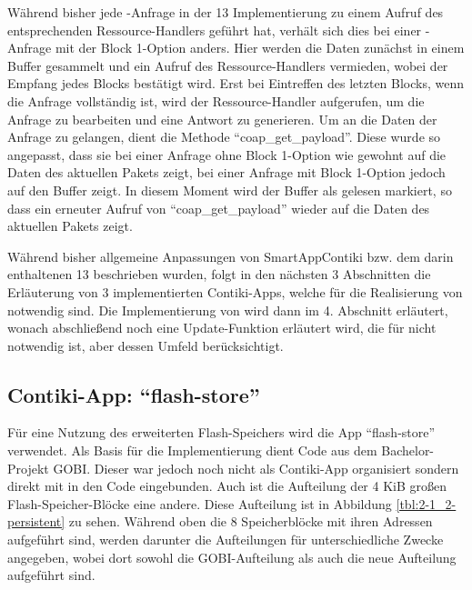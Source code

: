 Während bisher jede -Anfrage in der  13 Implementierung zu einem Aufruf des entsprechenden Ressource-Handlers geführt hat, verhält sich
dies bei einer -Anfrage mit der Block 1-Option anders. Hier werden die Daten zunächst in einem Buffer gesammelt und ein Aufruf des Ressource-Handlers
vermieden, wobei der Empfang jedes Blocks bestätigt wird. Erst bei Eintreffen des letzten Blocks, wenn die Anfrage vollständig ist, wird der Ressource-Handler
aufgerufen, um die Anfrage zu bearbeiten und eine Antwort zu generieren. Um an die Daten der Anfrage zu gelangen, dient die Methode "`coap\_get\_payload"'.
Diese wurde so angepasst, dass sie bei einer Anfrage ohne Block 1-Option wie gewohnt auf die Daten des aktuellen Pakets zeigt, bei einer Anfrage mit Block 1-Option
jedoch auf den Buffer zeigt. In diesem Moment wird der Buffer als gelesen markiert, so dass ein erneuter Aufruf von "`coap\_get\_payload"' wieder auf die Daten
des aktuellen Pakets zeigt.

Während bisher allgemeine Anpassungen von SmartAppContiki bzw. dem darin enthaltenen  13 beschrieben wurden, folgt in den nächsten 3 Abschnitten
die Erläuterung von 3 implementierten Contiki-Apps, welche für die Realisierung von  notwendig sind. Die Implementierung von  wird dann
im 4. Abschnitt erläutert, wonach abschließend noch eine Update-Funktion erläutert wird, die für  nicht notwendig ist, aber dessen Umfeld berücksichtigt.

\subsection{Contiki-App: "`flash-store"'}

Für eine Nutzung des erweiterten Flash-Speichers wird die App "`flash-store"' verwendet. Als Basis für die Implementierung dient Code aus dem Bachelor-Projekt
GOBI. Dieser war jedoch noch nicht als Contiki-App organisiert sondern direkt mit in den Code eingebunden. Auch ist die Aufteilung der 4 KiB großen
Flash-Speicher-Blöcke eine andere. Diese Aufteilung ist in Abbildung \ref{tbl:2-1_2-persistent} zu sehen. Während oben die 8 Speicherblöcke mit ihren Adressen
aufgeführt sind, werden darunter die Aufteilungen für unterschiedliche Zwecke angegeben, wobei dort sowohl die GOBI-Aufteilung als auch die neue
Aufteilung aufgeführt sind.

